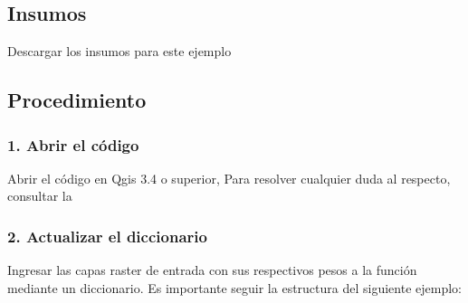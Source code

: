 \documentclass[letterpaper,10pt,spanish]{sphinxmanual}
\begin{document}
\subsection{Insumos}
\label{\detokenize{owa:insumos}}
Descargar los insumos para este ejemplo 


\subsection{Procedimiento}
\label{\detokenize{owa:procedimiento}}

\subsubsection{1. Abrir el código}
\label{\detokenize{owa:abrir-el-codigo}}
Abrir el código  en Qgis 3.4 o superior,
Para resolver cualquier duda al respecto, consultar la 

\noindent{}


\subsubsection{2. Actualizar el diccionario}
\label{\detokenize{owa:actualizar-el-diccionario}}
Ingresar las capas raster de entrada con sus respectivos pesos
a la función mediante un diccionario. Es importante seguir la
estructura del siguiente ejemplo:
\end{document}
